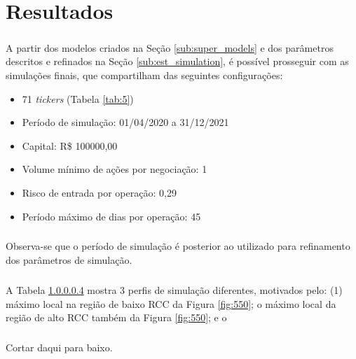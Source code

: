 \chapter{Resultados}
\label{cap4}



\paragraph{} A partir dos modelos criados na Seção \ref{sub:super_models} e dos parâmetros descritos e refinados na Seção \ref{sub:est_simulation}, é possível prosseguir com as simulações finais, que compartilham das seguintes configurações:

\begin{itemize}
    \item 71 \textit{tickers} (Tabela \ref{tab:5})
    \item Período de simulação: 01/04/2020 a 31/12/2021
    \item Capital: R\$ 100000,00
    \item Volume mínimo de ações por negociação: 1
    \item Risco de entrada por operação: 0,29
    \item Período máximo de dias por operação: 45
\end{itemize}

\paragraph{} Observa-se que o período de simulação é posterior ao utilizado para refinamento dos parâmetros de simulação.

\paragraph{} A Tabela \ref{} mostra 3 perfis de simulação diferentes, motivados pelo: (1) máximo local na região de baixo RCC da Figura \ref{fig:550}; o máximo local da região de alto RCC também da Figura \ref{fig:550}; e o

\paragraph{} Cortar daqui para baixo.


